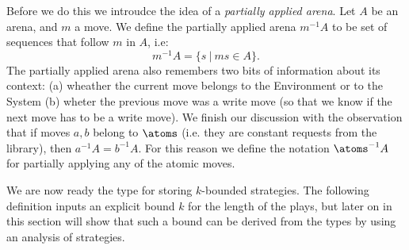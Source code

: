 Before we do this we introudce the idea of a \emph{partially applied arena}.
Let $A$ be an arena, and $m$ a move. We define the partially applied arena ${m^{-1}}A$ 
to be set of sequences that follow $m$ in $A$, i.e:
\[m^{-1}A = \{s \ | \ ms \in A \}.\]
The partially applied arena also remembers two bits of information about its context: (a) wheather the current move belongs to the Environment or to the System
(b) wheter the previous move was a write move (so that we know if the next move has to be a write move). We finish our discussion with the observation 
that if moves $a, b$ belong to $\atoms$ (i.e. they are constant requests from the library), then $a^{-1}A = b^{-1}A$. 
For this reason we define the notation $\atoms^{-1}A$ for partially applying any of the atomic moves. 


We are now ready the type for storing $k$-bounded strategies.  The following definition inputs an explicit bound $k$ for the length of the plays, but later on in this section will show that such a bound can be derived from the types by using an analysis of strategies.
